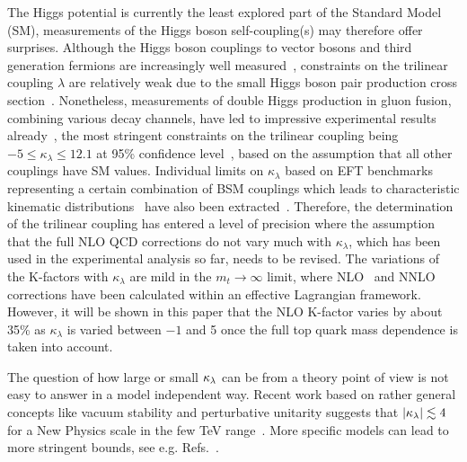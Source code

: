 The Higgs potential is currently the least explored part of the Standard Model (SM), measurements of the Higgs boson self-coupling(s) may therefore offer surprises.
Although the Higgs boson couplings to vector bosons and third generation fermions are increasingly well measured~\cite{Khachatryan:2016vau,Aaboud:2017vzb,ATLAS:2018doi,Sirunyan:2018koj,Sirunyan:2018sgc}, constraints on the trilinear coupling $\lambda$ are relatively weak due to the small Higgs boson pair production cross section~\cite{Baglio:2012np,Frederix:2014hta}.  
Nonetheless, measurements of double Higgs production in gluon fusion, combining various decay channels,  have led to impressive experimental results already~\cite{Sirunyan:2018two,Sirunyan:2018iwt,ATLAS-CONF-2018-043,Aaboud:2018ftw}, 
the most stringent constraints on the trilinear coupling being $-5\leq \kappa_\lambda\leq 12.1$
 at 95\% confidence level~\cite{ATLAS-CONF-2018-043}, based on the assumption that all other couplings have SM values.
Individual limits on $\kappa_\lambda$ based on EFT benchmarks representing a certain combination of BSM couplings which leads to characteristic kinematic distributions~\cite{Carvalho:2015ttv,Carvalho:2016rys,Buchalla:2018yce} have also been extracted~\cite{Sirunyan:2018two,Sirunyan:2018iwt}.
Therefore, the determination of the trilinear coupling has entered a level of precision where the assumption that the full NLO QCD corrections do not vary much with $\kappa_\lambda$, which has been used in the experimental analysis so far, needs to be revised.
The variations of the K-factors with $\kappa_\lambda$ are mild in the $m_t\to \infty$ limit, where NLO~\cite{Grober:2015cwa,Grober:2017gut} and NNLO~\cite{deFlorian:2017qfk} corrections have been calculated within an effective Lagrangian framework.
However, it will be shown in this paper that the NLO K-factor varies by about 35\% as $\kappa_\lambda$ is varied between $-1$ and 5 once the full top quark mass dependence is taken into account. 

The question of how large or small $\kappa_{\lambda}$ can be from a theory point of view is not easy to answer in a model independent way. 
Recent work based on rather general concepts like vacuum stability and perturbative unitarity suggests that $|\kappa_{\lambda}|\lesssim 4$ for a New Physics scale in the few TeV range~\cite{Falkowski:2019tft,Chang:2019vez,DiLuzio:2017tfn,DiVita:2017eyz}.
More specific models can lead to more stringent bounds, see e.g. Refs.~\cite{Braathen:2019pxr,Basler:2018dac,Babu:2018uik,Lewis:2017dme}.

\medskip

